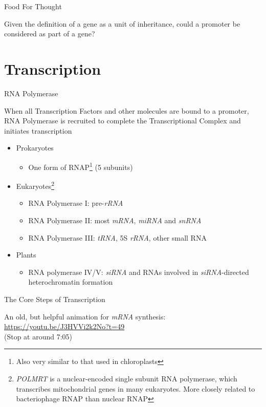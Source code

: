 \documentclass[aspectratio=169,11pt]{beamer}
\begin{document}
\begin{frame}{Food For Thought}

Given the definition of a gene as a unit of inheritance, could a promoter be considered as part of a gene?

\end{frame}

\section{Transcription}

\begin{frame}{RNA Polymerase}

When all Transcription Factors and other molecules are bound to a promoter, RNA Polymerase is recruited to complete the Transcriptional Complex and initiates transcription

	\begin{itemize}
		\item Prokaryotes
		\begin{itemize}
			\item One form of RNAP\footnote{Also very similar to that used in chloroplasts} (5 subunits)
		\end{itemize}		 
		\item Eukaryotes\footnote{\textit{POLMRT} is a nuclear-encoded single subunit RNA polymerase, which transcribes mitochondrial genes in many eukaryotes. More closely related to bacteriophage RNAP than nuclear RNAP}
		\begin{itemize}
			\item RNA Polymerase I:  pre-\textit{rRNA}
			\item RNA Polymerase II: most \textit{mRNA}, \textit{miRNA} and \textit{snRNA}
			\item RNA Polymerase III: \textit{tRNA}, 5S \textit{rRNA}, other small RNA
		\end{itemize}
		\item Plants
		\begin{itemize}
			\item RNA polymerase IV/V: \textit{siRNA} and RNAs involved in \textit{siRNA}-directed heterochromatin formation
		\end{itemize}
	\end{itemize}

\end{frame}

\begin{frame}{The Core Steps of Transcription}

An old, but helpful animation for \textit{mRNA} synthesis:\\[5mm]

\url{https://youtu.be/J3HVVi2k2No?t=49}\\[5mm]

(Stop at around 7:05)

\end{frame}
\end{document}
